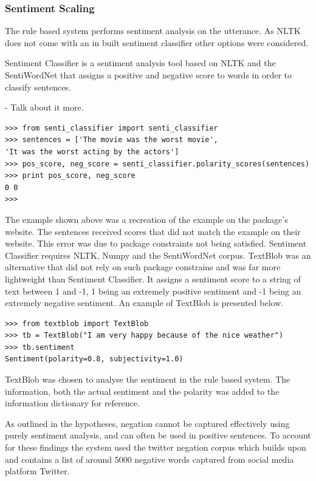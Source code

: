 \documentclass[bsc,frontabs,twoside,singlespacing,parskip]{infthesis}
\begin{document}
%	

\subsubsection{Sentiment Scaling}

The rule based system performs sentiment analysis on the utterance. As NLTK does not come with an in built sentiment classifier other options were considered. 

Sentiment Classifier \cite{senti_class} is a sentiment analysis tool based on NLTK and the SentiWordNet that assigns a positive and negative score to words in order to classify sentences.

- Talk about it more.

\begin{lstlisting}
>>> from senti_classifier import senti_classifier
>>> sentences = ['The movie was the worst movie', 
'It was the worst acting by the actors']
>>> pos_score, neg_score = senti_classifier.polarity_scores(sentences)
>>> print pos_score, neg_score
0 0
>>> 
\end{lstlisting}
The example shown above was a recreation of the example on the package's website. The sentences received scores that did not match the example on their website. This error was due to package constraints not being satisfied. Sentiment Classifier requires NLTK, Numpy and the SentiWordNet corpus. TextBlob \cite{text_blob} was an alternative that did not rely on such package constrains and was far more lightweight than Sentiment Classifier. It assigns a sentiment score to a string of text between 1 and -1, 1 being an extremely positive sentiment and -1 being an extremely negative sentiment. An example of TextBlob is presented below.

\begin{lstlisting}
>>> from textblob import TextBlob
>>> tb = TextBlob("I am very happy because of the nice weather")
>>> tb.sentiment
Sentiment(polarity=0.8, subjectivity=1.0)
\end{lstlisting}

TextBlob was chosen to analyse the sentiment in the rule based system. The information, both the actual sentiment and the polarity was added to the information dictionary for reference.

As outlined in the hypotheses, negation cannot be captured effectively using purely sentiment analysis, and can often be used in positive sentences. To account for these findings the system used the twitter negation corpus \cite{neg_corpus} which builds upon \cite{negation_corpus_1}\cite{negation_corpus_2} and contains a list of around 5000 negative words captured from social media platform Twitter.
\end{document}
